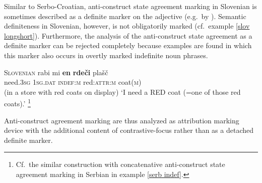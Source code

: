 Similar to Serbo-Croatian, anti-construct state agreement marking in Slovenian is sometimes described as a definite marker on the adjective (e.g.~by \citealt[411]{priestly1993}). Semantic definiteness in Slovenian, however, is not obligatorily marked (cf.~example \ref{slov longshort}). Furthermore, the analysis of the anti-construct state agreement as a definite marker can be rejected completely because examples are found in which this marker also occurs in overtly marked indefinite noun phrases.
\begin{exe}
\ex \textsc{Slovenian} \citep{marusic-etal2007}
\gll 	rabi mi \textbf{en} \textbf{rde\v{c}i} pla\v{s}\v{c}\\
	need.\textsc{3sg} \textsc{1sg.dat} \textsc{indef:m} red:\textsc{attr:m} coat(\textsc{m})\\
\glt (in a store with red coats on display) ‘I need a RED coat (=one of those red coats).’ \footnote{Cf.~the similar construction with concatenative anti-construct state agreement marking in Serbian in example \ref{serb indef}.}
\end{exe}
Anti-construct agreement marking are thus analyzed as attribution marking device with the additional content of contrastive-focus rather than as a detached definite marker.

